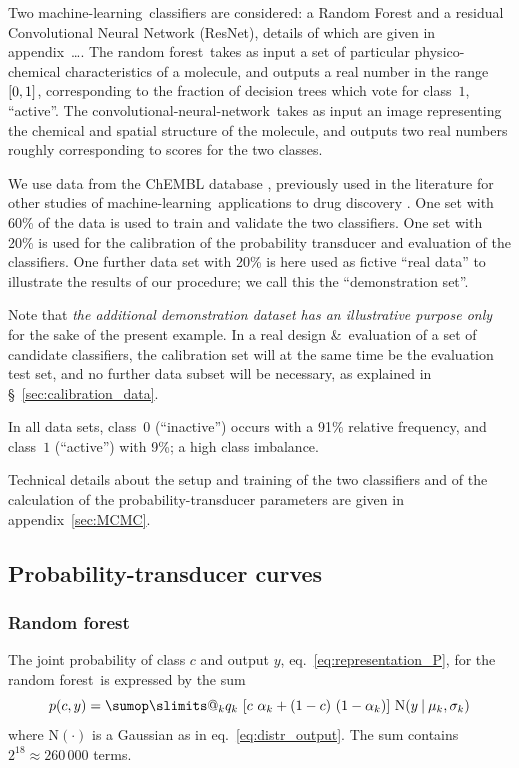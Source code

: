 \documentclass[\ifafour a4paper,12pt,\else a5paper,10pt,\fi%
onecolumn,oneside,article,%
british%
]{memoir}
\makeatletter
\theoremstyle{remark}
\theoremstyle{innote}
\def\sum{\DOTSI\sumop\slimits@}
\newcommand*{\amp}{\&}
\newcommand*{\pencil}{{\fontencoding{U}\fontfamily{fontawesometwo}\selectfont\symbol{210}}}
\newcommand{\mynotep}[1]{{\footnotesize\color{notecolour}\pencil\ #1}}
\DeclarePairedDelimiter\clcl{[}{]}
\renewcommand*{\|}[1][]{\nonscript\:#1\vert\nonscript\:\mathopen{}}
\newcommand*{\sect}{\S}%
\newcommand*{\eqn}{eq.}%
\newcommand*{\cf}{{cf.}}
\newcommand*{\ml}{machine-learning}
\newcommand*{\RF}{random forest}
\newcommand*{\cnn}{convolutional-neural-network}
\newcommand*{\No}{\mathrm{N}}
\makeatother
\begin{document}
Two \ml\ classifiers are considered: a Random Forest and a residual Convolutional Neural Network (ResNet), details of which are given in appendix\mynotep{\ldots}. The \RF\ takes as input a set of particular physico-chemical characteristics of a molecule, and outputs a real number in the range $\clcl{0,1}$, corresponding to the fraction of decision trees which vote for class~$1$, \enquote{active}. The \cnn\ takes as input an image representing the chemical and spatial structure of the molecule, and outputs two real numbers roughly corresponding to scores for the two classes.

We use data from the ChEMBL database \autocites{bentoetal2014}, previously used in the literature for other studies of \ml\ applications to drug discovery \autocites{koutsoukasetal2017}. One set with 60\% of the data is used to train and validate the two classifiers. One set with 20\% is used for the calibration of the probability transducer and evaluation of the classifiers. One further data set with 20\% is here used as fictive \enquote{real data} to illustrate the results of our procedure; we call this the \enquote{demonstration set}.

Note that \emph{the additional demonstration dataset has an illustrative purpose only} for the sake of the present example. In a real design \amp\ evaluation of a set of candidate classifiers, the calibration set will at the same time be the evaluation test set, and no further data subset will be necessary, as explained in \sect~\ref{sec:calibration_data}.

In all data sets, class~$0$ (\enquote{inactive}) occurs with a 91\% relative frequency, and class~$1$ (\enquote{active}) with 9\%; a high class imbalance.

Technical details about the setup and training of the two classifiers and of the calculation of the probability-transducer parameters are given in appendix~\ref{sec:MCMC}.



\subsection{Probability-transducer curves}
\label{sec:demo_curves}

\subsubsection{Random forest}
\label{sec:curve_RF}

The joint probability of class $c$ and output $y$, \eqn~\eqref{eq:representation_P}, for the \RF\ is expressed by the sum
\begin{equation}
  \label{eq:P_c_out_RF}
  p(c, y) = \sum_{k} q_{k}\
  [c\ \alpha_{k} + (1-c)\ (1-\alpha_{k})]\ 
  \No(y \| \mu_{k}, \sigma_{k})
\end{equation}
where $\No(\cdot)$ is a Gaussian as in \eqn~\eqref{eq:distr_output}. The sum contains $2^{18} \approx 260\,000$ terms.
\end{document}
